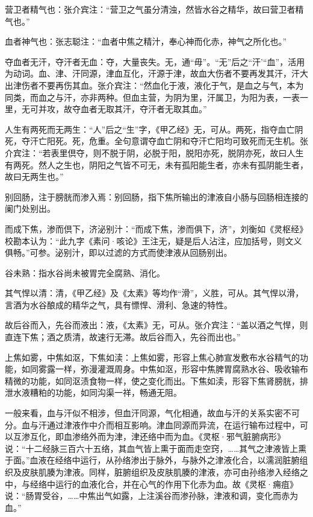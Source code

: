 \documentclass[12pt]{ctexbook}
\begin{document}
\begin{jiaozhu}
  \item 营卫者精气也：张介宾注：“营卫之气虽分清浊，然皆水谷之精华，故曰营卫者精气也。”
  \item 血者神气也：张志聪注：“血者中焦之精汁，奉心神而化赤，神气之所化也。”
  \item 夺血者无汗，夺汗者无血：夺，大量丧失。无，通“毋”。“无”后之“汗'“血”，活用为动词。血、津、汗同源，津血互化，汗源于津，故血大伤者不要再发其汗，汗大出津伤者不要再伤其血。张介宾注：“然血化于液，液化于气，是血之与气，本为同类，而血之与汗，亦非两种。但血主营，为阴为里，汗属卫，为阳为表，一表一里，无可并攻，故夺血者无取其汗，夺汗者无取其血。”
  \item 人生有两死而无两生：“人”后之“生”字，《甲乙经》无，可从。两死，指夺血亡阴死，夺汗亡阳死。死，危重。全句意谓夺血亡阴和夺汗亡阳均可致死而无生机。张介宾注：“若表里倶夺，则不脱于阴，必脱于阳，脱阳亦死，脱阴亦死，故曰人生有两死。然人之生也，阴阳之气皆不可无，未有孤阳能生者，亦未有孤阴能生者，故曰无两生也。”
  \item 别回肠，注于膀胱而渗入焉：别回肠，指下焦所输出的津液自小肠与回肠相连接的阑门处别出。
  \item 而成下焦，渗而倶下，济泌别汁：“而成下焦，渗而俱下，济”，刘衡如《灵枢经》校勘本认为：“此九字《素问·咳论》王注无，疑是后人沾注，应加括号，则文义俱畅。”可参。泌别汁，即以过滤的方式而使津液从回肠别出。
  \item 谷未熟：指水谷尚未被胃完全腐熟、消化。
  \item 其气悍以清：清，《甲乙经》及《太素》等均作“滑”，义胜，可从。其气悍以滑，言酒为水谷酿成的精华之气，具有慓悍、滑利、急速的特性。
  \item 故后谷而入，先谷而液出：液，《太素》无，可从。张介宾注：“盖以酒之气悍，则直连下焦；酒之质清，故速行无滞。故后谷而入，先谷而出也。”
  \item 上焦如雾，中焦如沤，下焦如渎：上焦如雾，形容上焦心肺宣发敷布水谷精气的功能，如同雾露一样，弥漫灌溉周身。中焦如沤，形容中焦脾胃腐熟水谷、吸收输布精微的功能，如同沤渍食物一样，使之变化而出。下焦如渎，形容下焦肾膀胱，排泄水液糟粕的功能，如同沟渠一祥，畅通无阻。
\end{jiaozhu}



一般来看，血与汗似不相涉，但血汗同源，气化相通，故血与汗的关系实密不可分。血与汗通过津液作中介而相互影响。津血同源而异流，在运行输布过程中，可以互渗互化，即血渗络外而为津，津还络中而为血。《灵枢·邪气脏腑病形》说：“十二经脉三百六十五络，其血气皆上熏于面而走空窍，……其气之津液皆上熏于面。”血液在经络中运行，从孙络渗出于脉外，与脉外之津液化合，以濡润脏腑组织及皮肤肌腠为津液。同样，脏腑组织及皮肤肌腠的津液，亦可由孙络渗入经络之中，与经络中运行的血液化合，并在心气的作用下化赤为血。故《灵枢·痈疽》说：“肠胃受谷，……中焦出气如露，上注溪谷而渗孙脉，津液和调，变化而赤为血。”
\end{document}

